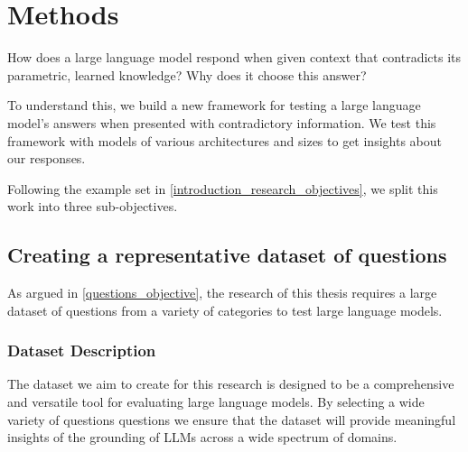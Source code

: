 \section{Methods}
\label{methods_section}

How does a large language model respond when given context that contradicts its parametric, learned knowledge? Why does it choose this answer?

To understand this, we build a new framework for testing a large language model's answers when presented with contradictory information.
We test this framework with models of various architectures and sizes to get insights about our responses.

Following the example set in \cref{introduction_research_objectives}, we split this work into three sub-objectives.

\subsection{Creating a representative dataset of questions}
\label{creating_dataset}

As argued in \cref{questions_objective}, the research of this thesis requires a large dataset of questions from a variety of categories to test large language models.

\subsubsection{Dataset Description}

The dataset we aim to create for this research is designed to be a comprehensive and versatile tool for evaluating large language models.
By selecting a wide variety of questions questions we ensure that the dataset will provide meaningful insights of the grounding of LLMs across a wide spectrum of domains.

